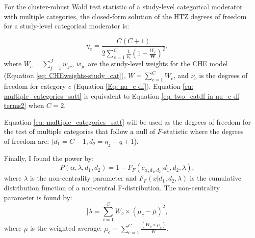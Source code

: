 For the cluster-robust Wald test statistic of a study-level categorical moderator with multiple categories, the closed-form solution of the HTZ degrees of freedom for a study-level categorical moderator is:

\begin{equation}
    \label{eq: multiple_categories_satt}
    \eta_z = \frac{C(C+1)}{2\sum_{c=1}^C \frac{1}{\nu_c}\left(1 - \frac{W_c}{\mathbf{W} } \right)^2},
\end{equation}
where $W_c = \sum_{j=1}^J \tilde{w}_{jc}$, $\tilde{w}_{jc}$ are the study-level weights for the CHE model (Equation \ref{eq: CHEweights-study_cat}), $W = \sum_{c=1}^C W_c$, and $\nu_c$ is the degrees of freedom for category $c$ (Equation \ref{Eq: nu_c df}). Equation \ref{eq: multiple_categories_satt} is equivalent to Equation \ref{eq: two_catdf in nu_c df terms2} when $C=2$.


Equation \ref{eq: multiple_categories_satt} will be used as the degrees of freedom for the test of multiple categories that follow a null of $F$-statistic where the degrees of freedom are:  $(d_1 = C-1, d_2 = \eta_z - q +1$).

Finally, I found the power by:
\begin{equation} \label{eq: power F}
    P(\alpha, \lambda, d_1, d_2) = 1 - F_F(c_{\alpha, d_1, d_2 }| d_1, d_2, \lambda),
\end{equation}
where $\lambda$ is the non-centrality parameter and $F_F(x| d_1, d_2, \lambda)$ is the cumulative distribution function of a non-central F-distribution. The non-centrality parameter is found by: 
\begin{equation} ] \label{eq: NCP}
    \lambda = \sum_{c=1}^C W_c \times (\mu_c - \overline{\mu})^2,
\end{equation}
where $\overline{\mu}$ is the weighted average: $\overline{\mu}_c = \sum_{c=1}^C \frac{(W_c \times \mu_c)}{W}$.







